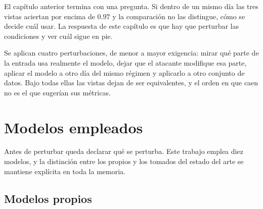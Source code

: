 %

El capítulo anterior termina con una pregunta. Si dentro de un mismo día las
tres vistas aciertan por encima de $0.97$ y la comparación no las distingue,
cómo se decide cuál usar. La respuesta de este capítulo es que hay que perturbar
las condiciones y ver cuál sigue en pie.

Se aplican cuatro perturbaciones, de menor a mayor exigencia: mirar qué parte de
la entrada usa realmente el modelo, dejar que el atacante modifique esa parte,
aplicar el modelo a otro día del mismo régimen y aplicarlo a otro conjunto de
datos. Bajo todas ellas las vistas dejan de ser equivalentes, y el orden en que
caen no es el que sugerían sus métricas.

\section{Modelos empleados}
\label{sec:modelos}

Antes de perturbar queda declarar qué se perturba. Este trabajo emplea diez
modelos, y la distinción entre los propios y los tomados del estado del arte se
mantiene explícita en toda la memoria.

\subsection*{Modelos propios}

